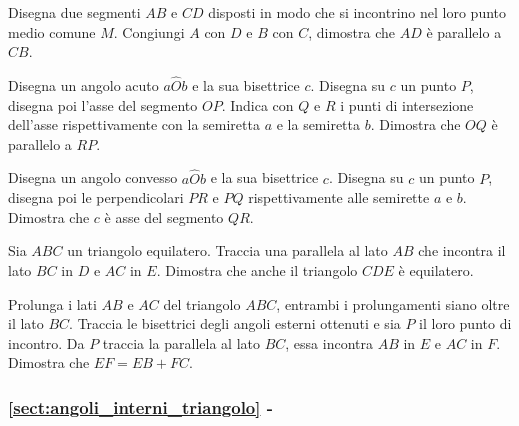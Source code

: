 \begin{multicols}{2}
\begin{esercizio}
\label{ese:3.42}
Disegna due segmenti \(AB\) e \(CD\) disposti in modo che si incontrino 
nel loro punto medio comune \(M\). Congiungi \(A\) con \(D\) e \(B\) con \(C\), 
dimostra che \(AD\) è parallelo a \(CB\).
\end{esercizio}

\begin{esercizio}
\label{ese:3.43}
Disegna un angolo acuto \(a\widehat{O}b\) e la sua bisettrice \(c\). 
Disegna su \(c\) un punto \(P\), disegna poi l'asse del segmento \(OP\). 
Indica con \(Q\) e \(R\) i punti di intersezione dell'asse 
rispettivamente con la semiretta \(a\) e la semiretta \(b\). Dimostra che 
\(OQ\) è parallelo a \(RP\).
\end{esercizio}

\begin{esercizio}
\label{ese:3.44}
Disegna un angolo convesso \(a\widehat{O}b\) e la sua bisettrice \(c\). 
Disegna su \(c\) un punto \(P\), disegna poi le perpendicolari \(PR\) e 
\(PQ\) rispettivamente alle semirette \(a\) e \(b\). Dimostra che \(c\) è asse 
del segmento \(QR\).
\end{esercizio}

\begin{esercizio}
\label{ese:3.45}
Sia \(ABC\) un triangolo equilatero. Traccia una parallela al lato \(AB\) 
che incontra il lato \(BC\) in \(D\) e \(AC\) in \(E\). Dimostra che anche il 
triangolo \(CDE\) è equilatero.
\end{esercizio}

\begin{esercizio}
\label{ese:3.46}
Prolunga i lati \(AB\) e \(AC\) del triangolo \(ABC\), entrambi i 
prolungamenti siano oltre il lato \(BC\). Traccia le bisettrici degli 
angoli esterni ottenuti e sia \(P\) il loro punto di incontro. Da \(P\) 
traccia la parallela al lato \(BC\), essa incontra \(AB\) in \(E\) e \(AC\) 
in \(F\). Dimostra che \(EF=EB+FC\).
\end{esercizio}
\end{multicols}

\begingroup
\hypersetup{linkcolor=black}
\subsubsection*{\ref{sect:angoli_interni_triangolo} - 
}
\endgroup

